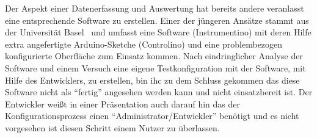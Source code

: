 Der Aspekt einer Datenerfassung und Auswertung hat bereits andere veranlasst 
eine entsprechende Software zu erstellen. Einer der jüngeren Ansätze stammt 
aus der Universität Basel~\cite{Instrumentino} und umfasst eine Software 
(Instrumentino) mit deren Hilfe extra angefertigte Arduino-Sketche (Controlino) 
und eine problembezogen konfigurierte Oberfläche zum Einsatz kommen. 
Nach eindringlicher Analyse der Software und einem Versuch eine eigene 
Testkonfiguration mit der Software, mit Hilfe des Entwicklers, zu erstellen, bin 
ihc zu dem Schluss gekommen das diese Software nicht als ``fertig'' angesehen 
werden kann und nicht einsatzbereit ist. Der Entwickler weißt in einer 
Präsentation  auch darauf hin das der Konfigurationsprozess einen 
``Administrator/Entwickler'' benötigt und es nicht vorgesehen ist diesen Schritt 
einem Nutzer zu überlassen. 